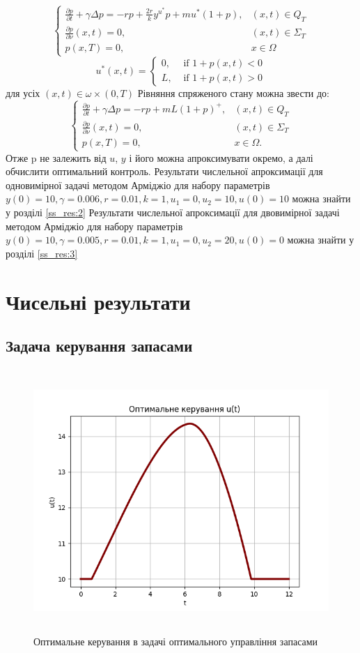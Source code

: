 \documentclass[a4paper,12pt]{extreport}
\begin{document}
$$
\begin{cases}\frac{\partial p}{\partial t}+\gamma \Delta p=-r p+\frac{2 r}{k} y^{u^*} p+m u^*(1+p), & (x, t) \in Q_T \\ \frac{\partial p}{\partial \nu}(x, t)=0, & (x, t) \in \Sigma_T \\ p(x, T)=0, & x \in \Omega\end{cases}
$$
$$
u^*(x, t)= \begin{cases}0, & \text { if } 1+p(x, t)<0 \\ L, & \text { if } 1+p(x, t)>0\end{cases}
$$
для усіх $(x, t) \in \omega \times(0, T)$
Рівняння спряженого стану можна звести до:
$$
\begin{cases}\frac{\partial p}{\partial t}+\gamma \Delta p=-r p+m L(1+p)^{+}, & (x, t) \in Q_T \\ \frac{\partial p}{\partial \nu}(x, t)=0, & (x, t) \in \Sigma_T \\ p(x, T)=0, & x \in \Omega .\end{cases}
$$
Отже p не залежить від $u$, $y$ і його можна апроксимувати окремо, а далі обчислити оптимальний контроль.
Результати числельної апроксимації для одновимірної задачі методом Арміджіо для набору параметрів $
y(0)=10, \gamma=0.006, r=0.01, k=1, u_1=0, u_2=10, u(0)=10
$
можна знайти у розділі \ref{ss_res:2}
Результати числельної апроксимації для двовимірної задачі методом Арміджіо для набору параметрів $
 y(0)=10, \gamma=0.005, r=0.01, k=1, u_1=0, u_2=20, u(0)=0
$ 
можна знайти у розділі \ref{ss_res:3}
\section{Чисельні результати}
\subsection{Задача керування запасами} \label{ss_res:1}
\begin{figure}[H]
\centering
\includegraphics[height=10cm, width=15cm]{figures/stock_management_optimal_control.png} 
\caption{Оптимальне керування в задачі оптимального управління запасами}
\label{im:1.1}
\end{figure}
\end{document}
